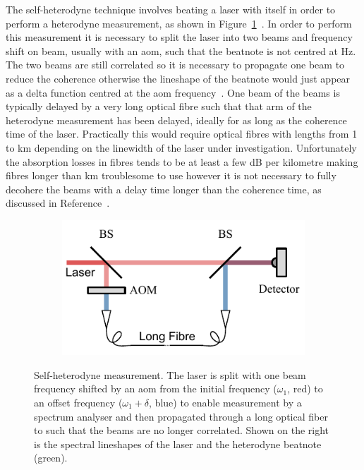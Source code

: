 The self-heterodyne technique involves beating a laser with itself in order to perform a heterodyne measurement, as shown in Figure~\ref{figure:self_heterodyne}~\cite{okoshi_novel_1980}.
In order to perform this measurement it is necessary to split the laser into two beams and frequency shift on beam, usually with an \gls{aom}, such that the beatnote is not centred at \unit[0]{Hz}.
The two beams are still correlated so it is necessary to propagate one beam to reduce the coherence otherwise the lineshape of the beatnote would just appear as a delta function centred at the \gls{aom} frequency~\cite{richter_linewidth_1986}.
One beam of the beams is typically delayed by a very long optical fibre such that that arm of the heterodyne measurement has been delayed, ideally for as long as the coherence time of the laser.
Practically this would require optical fibres with lengths from 1 to \unit[100]{km} depending on the linewidth of the laser under investigation.
Unfortunately the absorption losses in fibres tends to be at least a few dB per kilometre making fibres longer than \unit[10]{km} troublesome to use however it is not necessary to fully decohere the beams with a delay time longer than the coherence time, as discussed in Reference~\cite{richter_linewidth_1986}.

\begin{figure}
    \begin{subfigure}{0.49\linewidth}
    \includegraphics{part1/Figs/SelfHeterodyne.pdf}
    \end{subfigure}
    \begin{subfigure}{0.49\linewidth}
    
    \end{subfigure}
    \caption{Self-heterodyne measurement. The laser is split with one beam frequency shifted by an \gls{aom} from the initial frequency ($\omega_1$, red) to an offset frequency ($\omega_1+\delta$, blue) to enable measurement by a spectrum analyser and then propagated through a long optical fiber to such that the beams are no longer correlated. Shown on the right is the spectral lineshapes of the laser and the heterodyne beatnote (green).}
    \label{figure:self_heterodyne}
\end{figure}

